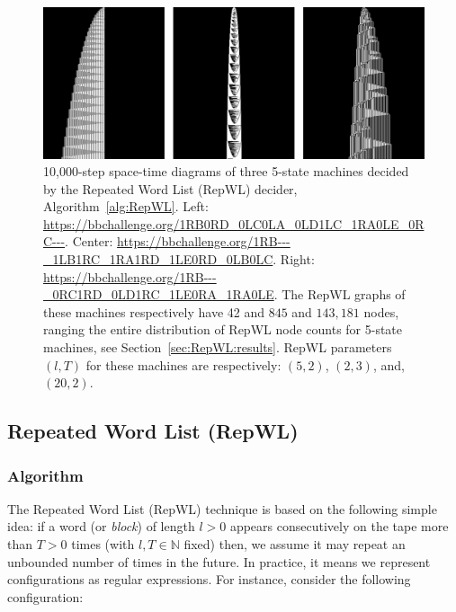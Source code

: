 \begin{figure}[h!]
    \centering
    \includegraphics[scale=0.48]{figures/RepWL/RepWL_three_machines.pdf}
    \caption{10,000-step space-time diagrams of three 5-state machines decided by the Repeated Word List (RepWL) decider, Algorithm~\ref{alg:RepWL}. Left: {\small \url{https://bbchallenge.org/1RB0RD_0LC0LA_0LD1LC_1RA0LE_0RC---}}. Center: {\small \url{https://bbchallenge.org/1RB---_1LB1RC_1RA1RD_1LE0RD_0LB0LC}}. Right: {\small \url{https://bbchallenge.org/1RB---_0RC1RD_0LD1RC_1LE0RA_1RA0LE}}. The RepWL graphs of these machines respectively have 42 and $845$ and $143{,}181$ nodes, ranging the entire distribution of RepWL node counts for 5-state machines, see Section~\ref{sec:RepWL:results}. RepWL parameters $(l,T)$ for these machines are respectively: $(5,2)$, $(2,3)$, and, $(20,2)$.
    }\label{fig:repWLThree}
\end{figure}

\subsection{Repeated Word List (RepWL)}\label{sec:RepWL}

\subsubsection{Algorithm}

The Repeated Word List (RepWL) technique is based on the following simple idea: if a word (or \textit{block}) of length $l > 0$ appears consecutively on the tape more than $T > 0$ times (with $l, T \in \mathbb{N}$ fixed) then, we assume it may repeat an unbounded number of times in the future. In practice, it means we represent configurations as regular expressions. For instance, consider the following configuration:

